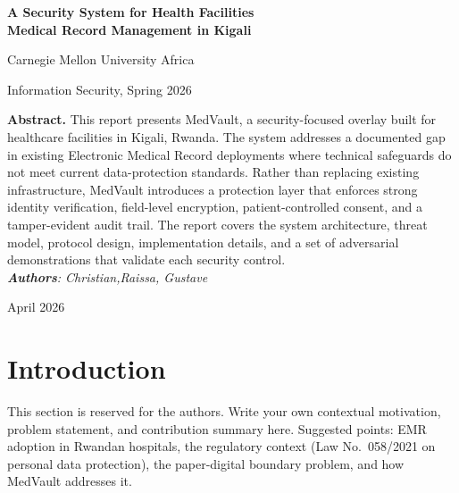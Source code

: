 \documentclass[11pt,a4paper]{article}
\begin{document}
\begin{titlepage}
  \centering
  \vspace*{3cm}
  {\Large\bfseries\color{reportBlue}
    A Security System for Health Facilities\\[6pt]
    Medical Record Management in Kigali}\par
  \vspace{1.2cm}
  {\normalsize Carnegie Mellon University Africa}\par
  {\normalsize Information Security, Spring 2026}\par
  \vspace{2cm}
  \begin{tcolorbox}[colback=lightGray,colframe=reportBlue!30,
    left=12pt,right=12pt,top=8pt,bottom=8pt,
    fontupper=\small\itshape]
    \textbf{Abstract.}
    This report presents MedVault, a security-focused overlay built for
    healthcare facilities in Kigali, Rwanda. The system addresses a
    documented gap in existing Electronic Medical Record deployments where
    technical safeguards do not meet current data-protection standards.
    Rather than replacing existing infrastructure, MedVault introduces a
    protection layer that enforces strong identity verification, field-level
    encryption, patient-controlled consent, and a tamper-evident audit trail.
    The report covers the system architecture, threat model, protocol design,
    implementation details, and a set of adversarial demonstrations that
    validate each security control.\\[4pt]
    \textit{\textbf{Authors}: Christian,Raissa, Gustave}
  \end{tcolorbox}
  \vfill
  {\small April 2026}
\end{titlepage}

\tableofcontents
\newpage


\section{Introduction}

\begin{tcolorbox}[colback=lightGray,colframe=midGray,
  left=8pt,right=8pt,top=6pt,bottom=6pt,fontupper=\small\itshape]
  This section is reserved for the authors. Write your own contextual
  motivation, problem statement, and contribution summary here.
  Suggested points: EMR adoption in Rwandan hospitals, the regulatory
  context (Law No.\ 058/2021 on personal data protection), the
  paper-digital boundary problem, and how MedVault addresses it.
\end{tcolorbox}
\end{document}
